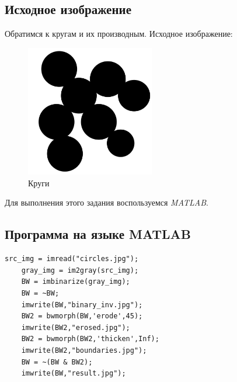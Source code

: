 \subsection{Исходное изображение}

Обратимся к кругам и их производным. Исходное изображение:

\begin{figure}[ht!]
    \centering
    \includegraphics[width=0.5\textwidth]{images/source_images/circles.jpg}
    \caption{Круги}
    \label{img:circles_orig}
\end{figure} 

Для выполнения этого задания воспользуемся \textit{MATLAB}.

\subsection{Программа на языке MATLAB}

\begin{lstlisting}[caption={Исходный код программы для разделения объектов}, label={lst:separation}]
    src_img = imread("circles.jpg");
    gray_img = im2gray(src_img);
    BW = imbinarize(gray_img);
    BW = ~BW;
    imwrite(BW,"binary_inv.jpg");
    BW2 = bwmorph(BW,'erode',45);
    imwrite(BW2,"erosed.jpg");
    BW2 = bwmorph(BW2,'thicken',Inf);
    imwrite(BW2,"boundaries.jpg");
    BW = ~(BW & BW2);
    imwrite(BW,"result.jpg");
\end{lstlisting}

